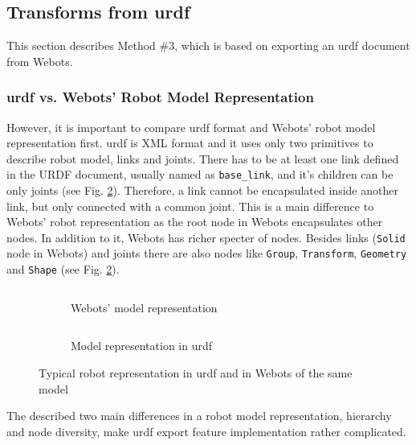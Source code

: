 \subsection{Transforms from \acs{urdf}}
This section describes Method \#3, which is based on exporting an \ac{urdf} document from Webots. 

\subsubsection{\acs{urdf} vs. Webots' Robot Model Representation}
However, it is important to compare \ac{urdf} format and Webots' robot model representation first. \ac{urdf} is XML format and it uses only two primitives to describe robot model, links and joints. There has to be at least one link defined in the URDF document, usually named as \texttt{base\_link}, and it's children can be only joints \cite{noauthor_urdf_nodate} (see Fig. \ref{fig:generalization:urdf_vs_webots:urdf}). Therefore, a link cannot be encapsulated inside another link, but only connected with a common joint. This is a main difference to Webots' robot representation as the root node in Webots encapsulates other nodes. In addition to it, Webots has richer specter of nodes. Besides links (\texttt{Solid} node in Webots) and joints there are also nodes like \texttt{Group}, \texttt{Transform}, \texttt{Geometry} and \texttt{Shape} (see Fig. \ref{fig:generalization:urdf_vs_webots:urdf}).

\begin{figure}[H]
\centering
\begin{subfigure}{.5\textwidth}
  \centering
  \inputminted{c}{generalization/data/simple.proto}
  \caption{Webots' model representation}
  \label{fig:generalization:urdf_vs_webots:webots}
\end{subfigure}%
\begin{subfigure}{.5\textwidth}
  \centering
  \inputminted[fontsize=\footnotesize]{xml}{generalization/data/simple.urdf}
  \caption{Model representation in \ac{urdf}}
  \label{fig:generalization:urdf_vs_webots:urdf}
\end{subfigure}
\caption{Typical robot representation in \ac{urdf} and in Webots of the same model}
\label{fig:generalization:urdf_vs_webots}
\end{figure}

The described two main differences in a robot model representation, hierarchy and node diversity, make \ac{urdf} export feature implementation rather complicated. 

